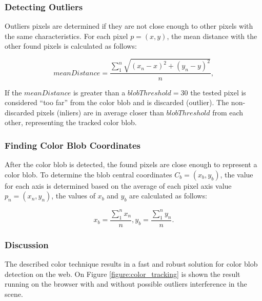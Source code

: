 \subsubsection{Detecting Outliers}
\label{sub:tracking_library_for_the_web:color_tracking_algorithm:color_blob_detection:detecting_outliers}

Outliers pixels are determined if they are not close enough to other pixels with the same characteristics. For each pixel $p=(x,y)$, the mean distance with the other found pixels is calculated as follows:

$$meanDistance=\frac{\sum_{1}^{n}\sqrt{(x_n-x)^2 + (y_n-y)^2}} {n},$$

If the $meanDistance$ is greater than a $blobThreshold=30$ the tested pixel is considered ``too far'' from the color blob and is discarded (outlier). The non-discarded pixels (inliers) are in average closer than $blobThreshold$ from each other, representing the tracked color blob.


\subsubsection{Finding Color Blob Coordinates}
\label{sub:tracking_library_for_the_web:color_tracking_algorithm:color_blob_detection:finding_color_blobs_coordinates}

After the color blob is detected, the found pixels are close enough to represent a color blob. To determine the blob central coordinates $C_b=(x_b,y_b)$, the value for each axis is determined based on the average of each pixel axis value $p_n=(x_n,y_n)$, the values of $x_b$ and $y_b$ are calculated as follows:

$$x_b=\frac{\sum_{1}^{n}x_n}{n}, y_b=\frac{\sum_{1}^{n}y_n}{n}.$$


\subsubsection{Discussion}
\label{sub:tracking_library_for_the_web:color_tracking_algorithm:color_blob_detection:discussion}

The described color technique results in a fast and robust solution for color blob detection on the web. On Figure \ref{figure:color_tracking} is shown the result running on the browser with and without possible outliers interference in the scene.


